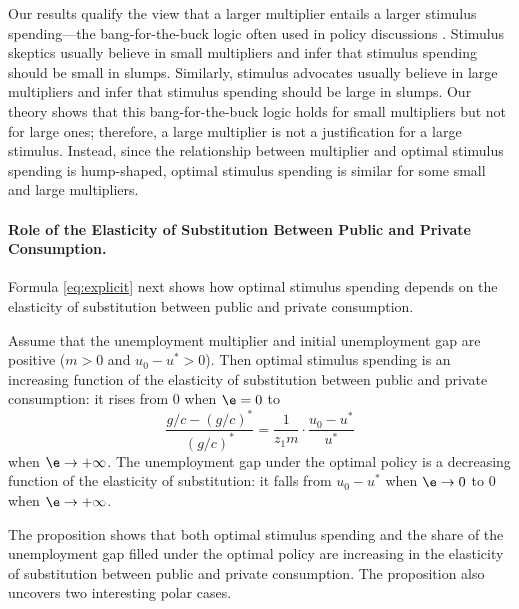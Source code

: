 \documentclass[letterpaper,12pt,leqno]{article}
\begin{document}
\begin{bibunit}
Our results qualify the view that a larger multiplier entails a larger stimulus spending---the bang-for-the-buck logic often used in policy discussions . Stimulus skeptics usually believe in small multipliers and infer that stimulus spending should be small in slumps. Similarly, stimulus advocates usually believe in large multipliers and infer that stimulus spending should be large in slumps. Our theory shows that this bang-for-the-buck logic holds for small multipliers but not for large ones; therefore, a large multiplier is not a justification for a large stimulus. Instead, since the relationship between multiplier and optimal stimulus spending is hump-shaped, optimal stimulus spending is similar for some small and large multipliers.

\paragraph{Role of the Elasticity of Substitution Between Public and Private Consumption.} Formula \eqref{eq:explicit} next shows how optimal stimulus spending depends on the elasticity of substitution between public and private consumption.

\begin{prop}\label{prop:e} Assume that the unemployment multiplier and initial unemployment gap are positive ($m>0$ and $u_{0}-u^{*}>0$). Then optimal stimulus spending is an increasing function of the elasticity of substitution between public and private consumption: it rises from 0 when $\e=0$ to 
\begin{equation*}
\frac{g/c-(g/c)^{*}}{(g/c)^{*}}=  \frac{1}{z_1  m}\cdot \frac{u_{0}-u^{*}}{u^{*}}
\end{equation*}
when $\e\to +\infty$. The unemployment gap under the optimal policy is a decreasing function of the elasticity of substitution: it falls from $u_{0}-u^*$ when $\e \to 0$ to $0$ when $\e\to +\infty$.\end{prop}

The proposition shows that both optimal stimulus spending and the share of the unemployment gap filled under the optimal policy are increasing in the elasticity of substitution between public and private consumption. The proposition also uncovers two interesting polar cases. 


\end{bibunit}
\end{document}
